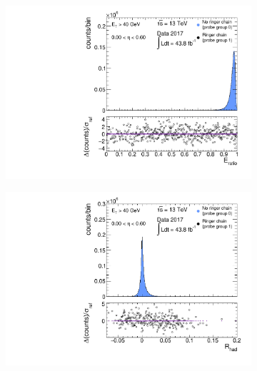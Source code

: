 \begin{figure}[b]
\begin{center}
\begin{subfigure}[c]{.48\textwidth}
\end{subfigure} \\
\begin{subfigure}[c]{.48\textwidth}
\centering
\includegraphics[width=\textwidth]{sections/04_analysis/figures/noAdjustment/el_eratio_et40eta0_00_sigma_base_new.pdf}
\caption{}%

\end{subfigure}
\hfill
\begin{subfigure}[c]{.48\textwidth}
\centering
\includegraphics[width=\textwidth]{sections/04_analysis/figures/noAdjustment/el_rhad_et40eta0_00_sigma_base_new.pdf}
\caption{}%


\end{subfigure}
\end{center}
\end{figure}
